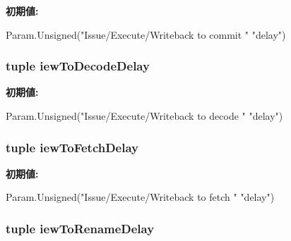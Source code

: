 \label{classSimpleOzoneCPU_1_1SimpleOzoneCPU_a724a185702137da4a74c263b1ea63fec}
{\bfseries 初期値:}
\begin{DoxyCode}
Param.Unsigned("Issue/Execute/Writeback to commit "
               "delay")
\end{DoxyCode}
\hypertarget{classSimpleOzoneCPU_1_1SimpleOzoneCPU_a9876f37ad91dd63a32345b53aafbddc6}{
\subsubsection[{iewToDecodeDelay}]{\setlength{\rightskip}{0pt plus 5cm}tuple {\bf iewToDecodeDelay}}}
\label{classSimpleOzoneCPU_1_1SimpleOzoneCPU_a9876f37ad91dd63a32345b53aafbddc6}
{\bfseries 初期値:}
\begin{DoxyCode}
Param.Unsigned("Issue/Execute/Writeback to decode "
               "delay")
\end{DoxyCode}
\hypertarget{classSimpleOzoneCPU_1_1SimpleOzoneCPU_a63165fb771c6aa1ecca842abe393a831}{
\subsubsection[{iewToFetchDelay}]{\setlength{\rightskip}{0pt plus 5cm}tuple {\bf iewToFetchDelay}}}
\label{classSimpleOzoneCPU_1_1SimpleOzoneCPU_a63165fb771c6aa1ecca842abe393a831}
{\bfseries 初期値:}
\begin{DoxyCode}
Param.Unsigned("Issue/Execute/Writeback to fetch "
               "delay")
\end{DoxyCode}
\hypertarget{classSimpleOzoneCPU_1_1SimpleOzoneCPU_a54dd22869ae708c0b6bffab65d4d03c5}{
\subsubsection[{iewToRenameDelay}]{\setlength{\rightskip}{0pt plus 5cm}tuple {\bf iewToRenameDelay}}}

